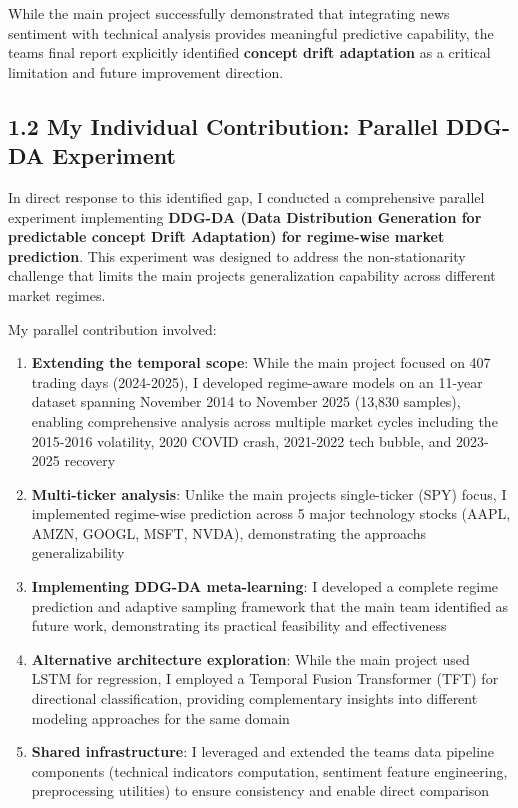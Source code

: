 \documentclass[
]{article}
\begin{document}
While the main project successfully demonstrated that integrating news
sentiment with technical analysis provides meaningful predictive
capability, the team\textquotesingle s final report explicitly
identified \textbf{concept drift adaptation} as a critical limitation
and future improvement direction.

\subsection{1.2 My Individual Contribution: Parallel DDG-DA
Experiment}\label{12-my-individual-contribution-parallel-ddg-da-experiment}

In direct response to this identified gap, I conducted a comprehensive
parallel experiment implementing \textbf{DDG-DA (Data Distribution
Generation for predictable concept Drift Adaptation) for regime-wise
market prediction}. This experiment was designed to address the
non-stationarity challenge that limits the main
project\textquotesingle s generalization capability across different
market regimes.

My parallel contribution involved:

\begin{enumerate}
\def\labelenumi{\arabic{enumi}.}
\item
  \textbf{Extending the temporal scope}: While the main project focused
  on 407 trading days (2024-2025), I developed regime-aware models on an
  11-year dataset spanning November 2014 to November 2025 (13,830
  samples), enabling comprehensive analysis across multiple market
  cycles including the 2015-2016 volatility, 2020 COVID crash, 2021-2022
  tech bubble, and 2023-2025 recovery
\item
  \textbf{Multi-ticker analysis}: Unlike the main
  project\textquotesingle s single-ticker (SPY) focus, I implemented
  regime-wise prediction across 5 major technology stocks (AAPL, AMZN,
  GOOGL, MSFT, NVDA), demonstrating the approach\textquotesingle s
  generalizability
\item
  \textbf{Implementing DDG-DA meta-learning}: I developed a complete
  regime prediction and adaptive sampling framework that the main team
  identified as future work, demonstrating its practical feasibility and
  effectiveness
\item
  \textbf{Alternative architecture exploration}: While the main project
  used LSTM for regression, I employed a Temporal Fusion Transformer
  (TFT) for directional classification, providing complementary insights
  into different modeling approaches for the same domain
\item
  \textbf{Shared infrastructure}: I leveraged and extended the
  team\textquotesingle s data pipeline components (technical indicators
  computation, sentiment feature engineering, preprocessing utilities)
  to ensure consistency and enable direct comparison
\end{enumerate}
\end{document}
